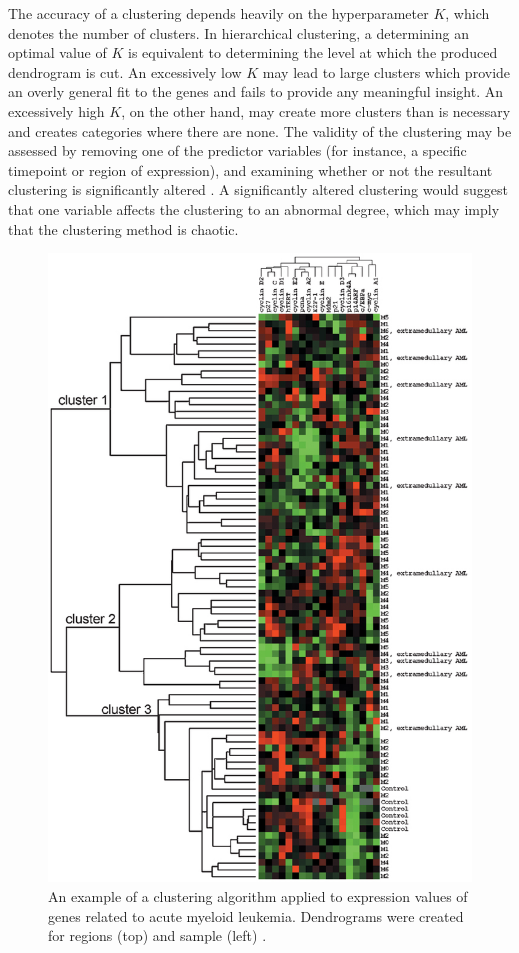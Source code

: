 \documentclass[12pt,oneside,onecolumn,a4paper]{article}
\begin{document}
The accuracy of a clustering depends heavily on the hyperparameter $K$, which denotes the number of clusters. In hierarchical clustering, a determining an optimal value of $K$ is equivalent to determining the level at which the produced dendrogram is cut. An excessively low $K$ may lead to large clusters which provide an overly general fit to the genes and fails to provide any meaningful insight. An excessively high $K$, on the other hand, may create more clusters than is necessary and creates categories where there are none. The validity of the clustering may be assessed by removing one of the predictor variables (for instance, a specific timepoint or region of expression), and examining whether or not the resultant clustering is significantly altered \citep{how_expression_works}. A significantly altered clustering would suggest that one variable affects the clustering to an abnormal degree, which may imply that the clustering method is chaotic.

\begin{figure}[h!]
\begin{center}
\includegraphics[scale=0.25]{figures/leukemia_clustering}
\caption{An example of a clustering algorithm applied to expression values of genes related to acute myeloid leukemia. Dendrograms were created for regions (top) and sample (left) \citep{leukemia_clustering}.\label{fig:leukemia}
}
\end{center}
\end{figure}
\end{document}
